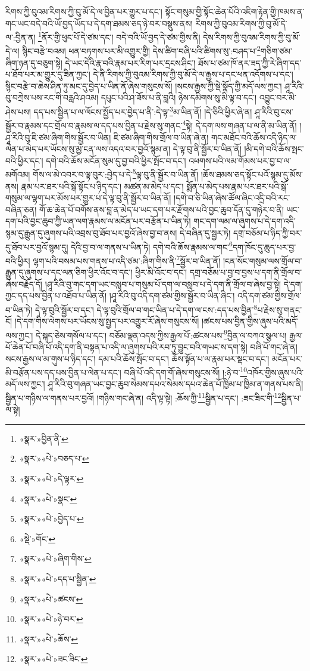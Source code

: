 རིགས་ཀྱི་བུའམ་རིགས་ཀྱི་བུ་མོ་དེ་ལ་བྱིན་པར་གྱུར་པ་དང་། སྟོང་གསུམ་གྱི་སྟོང་ཆེན་པོའི་འཇིག་རྟེན་གྱི་ཁམས་ན་གང་ཡང་བདེ་བའི་ཡོ་བྱད་ཡོད་པ་དེ་དག་ཐམས་ཅད་ཉེ་བར་བསྡུས་ནས། རིགས་ཀྱི་བུའམ་རིགས་ཀྱི་བུ་མོ་དེ་ལ་:བྱིན་ན། \footnote{«སྣར་»བྱིན་ནི་}ནོར་གྱི་ཕུང་པོ་དེ་ཙམ་དང་། བདེ་བའི་ཡོ་བྱད་དེ་ཙམ་གྱིས་ནི། དེས་རིགས་ཀྱི་བུའམ་རིགས་ཀྱི་བུ་མོ་དེ་ལ། སྙིང་བརྩེ་བའམ། ཕན་བཏགས་པར་མི་འགྱུར་གྱི། དེས་ཚིག་བཞི་པའི་ཚིགས་སུ་:བཤད་པ་\footnote{«སྣར་»«པེ་»བཅད་པ་}གཅིག་ཙམ་ཞིག་ཉན་དུ་བཅུག་སྟེ། དེ་ཡང་དེའི་རྣ་བའི་རྣམ་པར་རིག་པར་དྲངས་ཤིང་། ཐོས་པ་ཙམ་ཁོ་ནར་ཟད་ཀྱི་རེ་ཞིག་དད་པ་ཐོབ་པར་མ་གྱུར་དུ་ཟིན་ཀྱང་། དེ་ནི་རིགས་ཀྱི་བུའམ་རིགས་ཀྱི་བུ་མོ་དེ་ལ་རྒྱས་པ་དང་ཕན་འདོགས་པ་དང་། སྙིང་བརྩེ་བ་ཆེས་ཤིན་ཏུ་མང་དུ་བྱེད་པ་ཡིན་ནོ་ཞེས་གསུངས་སོ། །སངས་རྒྱས་ཀྱི་སྡེ་སྣོད་ཀྱི་མདོ་ལས་ཀྱང་། ཤཱ་རིའི་བུ་བཀྲེས་པས་རང་གི་བརླའི་ཤའམ། དཔུང་པའི་ཤ་ཟོས་པ་ནི་བླའི། ཉེས་དམིགས་སུ་མི་ལྟ་བ་དང་། འབྱུང་བར་མི་ཤེས་པས། དད་པས་སྦྱིན་པ་ལ་ལོངས་སྤྱོད་པར་བྱེད་པ་ནི་:དེ་ལྟ་\footnote{«སྣར་»«པེ་»དེ་ལྟར་}མ་ཡིན་ནོ། །དེ་ཅིའི་ཕྱིར་ཞེ་ན། ཤཱ་རིའི་བུ་ངས་སྦྱོར་བ་རྣམས་དང་གྲོལ་བ་རྣམས་ལ་དད་པས་བྱིན་པ་རྗེས་སུ་གནང་\footnote{«སྣར་»«པེ་»སྣང་}སྟེ། དེ་དག་ལས་གཞན་པ་ལ་ནི་མ་ཡིན་ནོ། །ཤཱ་རིའི་བུ་ཇི་ཙམ་ཞིག་གིས་སྦྱོར་བ་ཡིན། ཇི་ཙམ་ཞིག་གིས་གྲོལ་བ་ཡིན་ཞེ་ན། གང་མཐོང་བའི་ཆོས་འདི་ཉིད་ལ་ལེན་པ་མེད་པར་ཡོངས་སུ་མྱ་ངན་ལས་འདའ་བར་བྱའོ་སྙམ་ན། དེ་ལྟ་བུ་ནི་སྦྱོར་བ་ཡིན་ནོ། །མི་དགེ་བའི་ཆོས་སྤང་བའི་ཕྱིར་དང་། དགེ་བའི་ཆོས་མངོན་སུམ་དུ་བྱ་བའི་ཕྱིར་སྤོང་བ་དང་། འཕགས་པའི་ལམ་གོམས་པར་བྱ་བ་ལ་མགོའམ། གོས་ལ་མེ་འབར་བ་ལྟ་བུར་:བྱེད་པ་དེ་\footnote{«སྣར་»«པེ་»བྱེད་པ་}ལྟ་བུ་ནི་སྦྱོར་བ་ཡིན་ནོ། །ཆོས་ཐམས་ཅད་སྟོང་པའོ་སྙམ་དུ་མོས་ནས། རྣམ་པར་ཐར་པའི་སྒོ་སྟོང་པ་ཉིད་དང་། མཚན་མ་མེད་པ་དང་། སྨོན་པ་མེད་པས་རྣམ་པར་ཐར་པའི་སྒོ་གསུམ་ལ་ལྷག་པར་མོས་པར་གྱུར་པ་དེ་ལྟ་བུ་ནི་སྦྱོར་བ་ཡིན་ནོ། །དགེ་བ་ཅི་ཡིན་ཞེས་ཚོལ་ཞིང་འདྲི་བའི་རང་བཞིན་ཅན། གོ་ཆ་ཆེན་པོ་བགོས་ནས་བླ་ན་མེད་པ་ཡང་དག་པར་རྫོགས་པའི་བྱང་ཆུབ་དོན་དུ་གཉེར་བ་ནི། ཡང་དག་པའི་བྱང་ཆུབ་ཀྱི་ཡན་ལག་རྣམས་ལ་མངོན་པར་བརྩོན་པ་ཡིན་ཏེ། གང་དག་ལམ་ལ་ཞུགས་པ་དེ་དག་འདི་སྙམ་དུ་རྒྱུན་དུ་ཞུགས་པའི་འབྲས་བུ་ཐོབ་པར་བྱའོ་ཞེས་བྱ་བ་ནས། དེ་བཞིན་དུ་སྦྱར་ཏེ། དགྲ་བཅོམ་པ་ཉིད་ཀྱི་བར་དུ་ཐོབ་པར་བྱའོ་སྙམ་དུ། དེའི་བྱ་བ་ལ་གནས་པ་ཡིན་ཏེ། དགེ་བའི་ཆོས་རྣམས་ལ་གང་\footnote{«སྡེ་»གོང་}དག་ཁོང་དུ་ཆུད་པར་བྱ་བའི་ཕྱིར། ལྷག་པའི་བསམ་པས་གནས་པ་འདི་ཙམ་:ཞིག་གིས་ནི་\footnote{«སྣར་»«པེ་»ཞིག་གིས་}སྦྱོར་བ་ཡིན་ནོ། །ངན་སོང་གསུམ་ལས་གྲོལ་བ་རྒྱུན་དུ་ཞུགས་པ་དང་ལན་ཅིག་ཕྱིར་འོང་བ་དང་། ཕྱིར་མི་འོང་བ་དང་། དགྲ་བཅོམ་པ་བྱ་བ་བྱས་པ་དག་ནི་གྲོལ་བ་ཞེས་བརྗོད་དོ། །ཤཱ་རིའི་བུ་གང་དག་ཡང་བསླབ་པ་གསུམ་པོ་དག་ལ་བསླབ་པ་དེ་དག་ནི་གྲོལ་བ་ཞེས་བྱ་སྟེ། དེ་དག་ཀྱང་དད་པས་བྱིན་པ་འཐོབ་པ་ཡིན་ནོ། །ཤཱ་རིའི་བུ་འདི་དག་ཙམ་གྱིས་སྦྱོར་བ་ཡིན་ཞིང་། འདི་དག་ཙམ་གྱིས་གྲོལ་བ་ཡིན་ཏེ། དེ་ལྟ་བུའི་སྦྱོར་བ་དང་། དེ་ལྟ་བུའི་གྲོལ་བ་གང་ཡིན་པ་དེ་དག་ལ་ངས་:དད་པས་བྱིན་\footnote{«སྣར་»«པེ་»དད་པ་སྦྱིན་}པ་རྗེས་སུ་གནང་ངོ། །དེ་དག་གིས་ལེགས་པར་ཡོངས་སུ་སྤྱད་པར་འགྱུར་རོ་ཞེས་གསུངས་སོ། །ཚངས་པས་བྱིན་གྱིས་ཞུས་པའི་མདོ་ལས་ཀྱང་། དེ་སྐད་ཅེས་གསོལ་པ་དང་། བཅོམ་ལྡན་འདས་ཀྱིས་རྒྱལ་པོ་:ཚངས་པས་\footnote{«སྣར་»«པེ་»ཚངས་}བྱིན་ལ་བཀའ་སྩལ་པ། རྒྱལ་པོ་ཆེན་པོ་བཞི་པོ་འདི་དག་ནི་བསྟན་པ་འདི་ལ་ཞུགས་པའི་རབ་ཏུ་བྱུང་བའི་གཡང་ས་དག་སྟེ། བཞི་པོ་གང་ཞེ་ན། སངས་རྒྱས་ལ་མ་གུས་པ་ཉིད་དང་། དམ་པའི་ཆོས་སྤོང་བ་དང་། ཆོས་སྟོན་པ་ལ་རྣམ་པར་སྡང་བ་དང་། མངོན་པར་མི་བརྩོན་པས་དད་པས་བྱིན་པ་ལེན་པ་དང་། བཞི་པོ་འདི་དག་གོ་ཞེས་གསུངས་སོ། །:ཉེ་བ་\footnote{«སྣར་»«པེ་»ཉེ་བར་}འཁོར་གྱིས་ཞུས་པའི་མདོ་ལས་ཀྱང་། ཤཱ་རིའི་བུ་གཞན་ཡང་བྱང་ཆུབ་སེམས་དཔའ་སེམས་དཔའ་ཆེན་པོ་ཁྱིམ་པ་ཁྱིམ་ན་གནས་པས་ནི། སྦྱིན་པ་གཉིས་ལ་གནས་པར་བྱའོ། །གཉིས་གང་ཞེ་ན། འདི་ལྟ་སྟེ། :ཆོས་ཀྱི་\footnote{«སྣར་»«པེ་»ཆོས་}སྦྱིན་པ་དང་། :ཟང་ཟིང་གི་\footnote{«སྣར་»«པེ་»ཟང་ཟིང་}སྦྱིན་པ་ལ་སྟེ། 